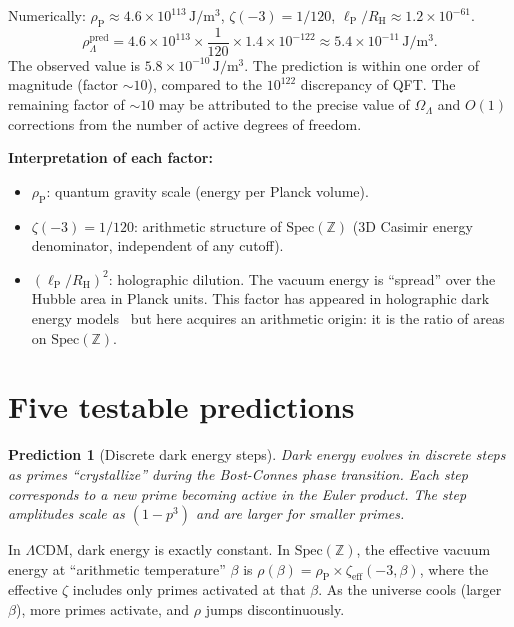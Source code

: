 \documentclass[11pt,a4paper]{article}
\newtheorem{prediction}[theorem]{Prediction}
\newcommand{\Spec}{\mathrm{Spec}}
\newcommand{\lP}{\ell_{\mathrm{P}}}
\newcommand{\RH}{R_{\mathrm{H}}}
\newcommand{\rhoP}{\rho_{\mathrm{P}}}
\begin{document}
Numerically:
$\rhoP \approx 4.6 \times 10^{113}\,\mathrm{J/m^3}$,
$\zeta(-3) = 1/120$,
$\lP/\RH \approx 1.2 \times 10^{-61}$.
\begin{equation}
  \rho_\Lambda^{\mathrm{pred}} = 4.6 \times 10^{113} \times
  \frac{1}{120} \times 1.4 \times 10^{-122}
  \approx 5.4 \times 10^{-11}\,\mathrm{J/m^3}.
\end{equation}
The observed value is $5.8 \times 10^{-10}\,\mathrm{J/m^3}$.
The prediction is within one order of magnitude
(factor $\sim 10$), compared to the $10^{122}$ discrepancy
of QFT. The remaining factor of $\sim 10$ may be attributed to
the precise value of $\Omega_\Lambda$ and $O(1)$ corrections
from the number of active degrees of freedom.

\textbf{Interpretation of each factor:}
\begin{itemize}
\item $\rhoP$: quantum gravity scale (energy per Planck volume).
\item $\zeta(-3) = 1/120$: arithmetic structure of $\Spec(\mathbb{Z})$
  (3D Casimir energy denominator, independent of any cutoff).
\item $(\lP/\RH)^2$: holographic dilution. The vacuum energy is
  ``spread'' over the Hubble area in Planck units.
  This factor has appeared in holographic dark energy
  models~\cite{Li2004} but here acquires an arithmetic origin:
  it is the ratio of areas on $\Spec(\mathbb{Z})$.
\end{itemize}

\section{Five testable predictions}

\begin{prediction}[Discrete dark energy steps]
\label{pred:steps}
Dark energy evolves in discrete steps as primes ``crystallize''
during the Bost-Connes phase transition. Each step corresponds
to a new prime becoming active in the Euler product.
The step amplitudes scale as $(1 - p^3)$ and are larger for
smaller primes.
\end{prediction}

In $\Lambda$CDM, dark energy is exactly constant.
In $\Spec(\mathbb{Z})$, the effective vacuum energy at
``arithmetic temperature'' $\beta$ is
$\rho(\beta) = \rhoP \times \zeta_{\mathrm{eff}}(-3, \beta)$,
where the effective $\zeta$ includes only primes activated
at that $\beta$. As the universe cools (larger $\beta$),
more primes activate, and $\rho$ jumps discontinuously.
\end{document}
